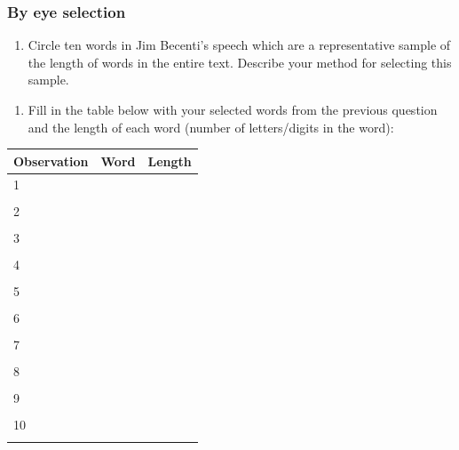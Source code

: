 \documentclass[
]{report}
\providecommand{\tightlist}{%
  \setlength{\itemsep}{0pt}\setlength{\parskip}{0pt}}
\begin{document}
\subsubsection*{By eye selection}\label{by-eye-selection}

\begin{enumerate}
\def\labelenumi{\arabic{enumi}.}
\tightlist
\item
  Circle ten words in Jim Becenti's speech which are a representative sample of the length of words in the entire text. Describe your method for selecting this sample.
\end{enumerate}

\vspace{0.7in}

\begin{enumerate}
\def\labelenumi{\arabic{enumi}.}
\setcounter{enumi}{1}
\tightlist
\item
  Fill in the table below with your selected words from the previous question and the length of each word (number of letters/digits in the word):
  \vspace{1mm}
\end{enumerate}

\begin{center}
\begin{tabular}{|l|p{3in}|p{1in}|} \hline
Observation & Word & Length  \\ \hline
1 & & \\ 
& & \\ \hline
2 & & \\ 
& & \\ \hline
3 & & \\ 
& & \\ \hline
4 & & \\ 
& & \\ \hline
5 & & \\ 
& & \\ \hline
6 & & \\ 
& & \\ \hline
7 & & \\
& & \\ \hline
8 & & \\ 
& & \\ \hline
9 & & \\ 
& & \\ \hline
10 & & \\ 
& & \\ \hline
\end{tabular}
\end{center}
\end{document}
